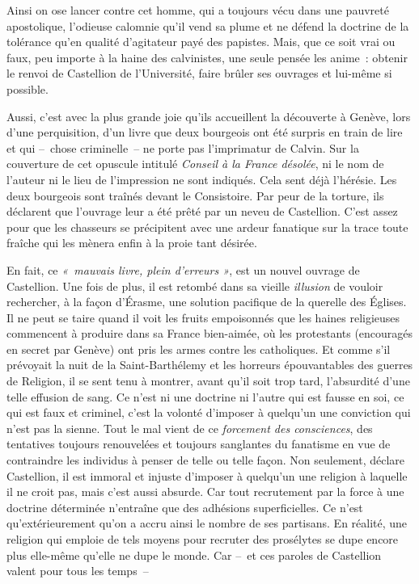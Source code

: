 \documentclass[french,twoside]{book} %
\begin{document}
\noindent Ainsi on ose lancer contre cet homme, qui a toujours vécu dans une pauvreté apostolique, l’odieuse calomnie qu’il vend sa plume et ne défend la doctrine de la tolérance qu’en qualité d’agitateur payé des papistes. Mais, que ce soit vrai ou faux, peu importe à la haine des calvinistes, une seule pensée les anime : obtenir le renvoi de Castellion de l’Université, faire brûler ses ouvrages et lui-même si possible.\par
Aussi, c’est avec la plus grande joie qu’ils accueillent la découverte à Genève, lors d’une perquisition, d’un livre que deux bourgeois ont été surpris en train de lire et qui – chose criminelle – ne porte pas l’imprimatur de Calvin. Sur la couverture de cet opuscule intitulé \emph{Conseil à la France désolée}, ni le nom de l’auteur ni le lieu de l’impression ne sont indiqués. Cela sent déjà l’hérésie. Les deux bourgeois sont traînés devant le Consistoire. Par peur de la torture, ils déclarent que l’ouvrage leur a été prêté par un neveu de Castellion. C’est assez pour que les chasseurs se précipitent avec une ardeur fanatique sur la trace toute fraîche qui les mènera enfin à la proie tant désirée.\par
En fait, ce \emph{« mauvais livre, plein d’erreurs »}, est un nouvel ouvrage de Castellion. Une fois de plus, il est retombé dans sa vieille \emph{illusion} de vouloir rechercher, à la façon d’Érasme, une solution pacifique de la querelle des Églises. Il ne peut se taire quand il voit les fruits empoisonnés que les haines religieuses commencent à produire dans sa France bien-aimée, où les protestants (encouragés en secret par Genève) ont pris les armes contre les catholiques. Et comme s’il prévoyait la nuit de la Saint-Barthélemy et les horreurs épouvantables des guerres de Religion, il se sent tenu à montrer, avant qu’il soit trop tard, l’absurdité d’une telle effusion de sang. Ce n’est ni une doctrine ni l’autre qui est fausse en soi, ce qui est faux et criminel, c’est la volonté d’imposer à quelqu’un une conviction qui n’est pas la sienne. Tout le mal vient de ce \emph{forcement des consciences}, des tentatives toujours renouvelées et toujours sanglantes du fanatisme en vue de contraindre les individus à penser de telle ou telle façon. Non seulement, déclare Castellion, il est immoral et injuste d’imposer à quelqu’un une religion à laquelle il ne croit pas, mais c’est aussi absurde. Car tout recrutement par la force à une doctrine déterminée n’entraîne que des adhésions superficielles. Ce n’est qu’extérieurement qu’on a accru ainsi le nombre de ses partisans. En réalité, une religion qui emploie de tels moyens pour recruter des prosélytes se dupe encore plus elle-même qu’elle ne dupe le monde. Car – et ces paroles de Castellion valent pour tous les temps –\par
\end{document}
